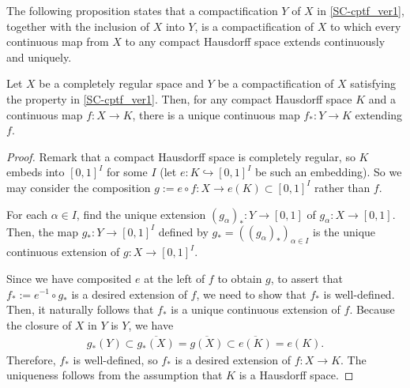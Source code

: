The following proposition states that a compactification $Y$ of $X$ in \cref{SC-cptf_ver1}, together with the inclusion of $X$ into $Y$, is a compactification of $X$ to which every continuous map from $X$ to any compact Hausdorff space extends continuously and uniquely.
\begin{prop}
    Let $X$ be a completely regular space and $Y$ be a compactification of $X$ satisfying the property in \cref{SC-cptf_ver1}.
    Then, for any compact Hausdorff space $K$ and a continuous map $f: X\rightarrow K$, there is a unique continuous map $f_*: Y\rightarrow K$ extending $f$.
\end{prop}
\begin{proof}
    Remark that a compact Hausdorff space is completely regular, so $K$ embeds into $[0, 1]^I$ for some $I$ (let $e: K\hookrightarrow[0, 1]^I$ be such an embedding).
    So we may consider the composition $g:=e\circ f: X\rightarrow e(K)\subset[0, 1]^I$ rather than $f$.
    
    For each $\alpha\in I$, find the unique extension $(g_\alpha)_*: Y\rightarrow[0, 1]$ of $g_\alpha: X\rightarrow[0, 1]$.
    Then, the map $g_*: Y\rightarrow[0, 1]^I$ defined by $g_*=((g_\alpha)_*)_{\alpha\in I}$ is the unique continuous extension of $g: X\rightarrow[0, 1]^I$.
    
    Since we have composited $e$ at the left of $f$ to obtain $g$, to assert that $f_*:=e^{-1}\circ g_*$ is a desired extension of $f$, we need to show that $f_*$ is well-defined.
    Then, it naturally follows that $f_*$ is a unique continuous extension of $f$.
    Because the closure of $X$ in $Y$ is $Y$, we have
    \begin{align*}
        g_*(Y)\subset\overline{g_*(X)}=\overline{g(X)}\subset\overline{e(K)}=e(K).
    \end{align*}
    Therefore, $f_*$ is well-defined, so $f_*$ is a desired extension of $f: X\rightarrow K$.
    The uniqueness follows from the assumption that $K$ is a Hausdorff space.
\end{proof}

